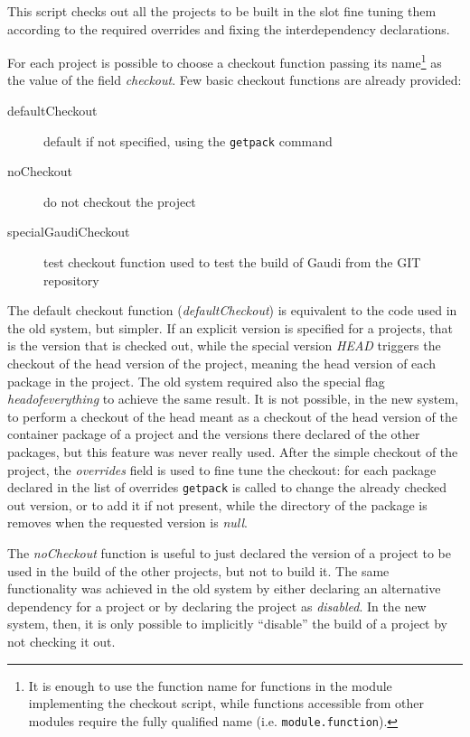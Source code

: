 \documentclass{lhcbnote}
\begin{document}
This script checks out all the projects to be built in the slot fine tuning them
according to the required overrides and fixing the interdependency declarations.

For each project is possible to choose a checkout function passing its
name\footnote{It is enough to use the function name for functions in the module
implementing the checkout script, while functions accessible from other modules
require the fully qualified name (i.e. \texttt{module.function}).} as the value
of the field \emph{checkout}.  Few basic checkout functions are already
provided:
\begin{description}
  \item[defaultCheckout] default if not specified, using the \texttt{getpack}
  command
  \item[noCheckout] do not checkout the project
  \item[specialGaudiCheckout] test checkout function used to test the build of
  Gaudi from the GIT repository
\end{description}

The default checkout function (\emph{defaultCheckout}) is equivalent to the code
used in the old system, but simpler.  If an explicit version is specified for a
projects, that is the version that is checked out, while the special version
\emph{HEAD} triggers the checkout of the head version of the project, meaning
the head version of each package in the project.  The old system required also
the special flag \emph{headofeverything} to achieve the same result.  It is not
possible, in the new system, to perform a checkout of the head meant as a
checkout of the head version of the container package of a project and the
versions there declared of the other packages, but this feature was never really
used.  After the simple checkout of the project, the \emph{overrides} field is
used to fine tune the checkout: for each package declared in the list of
overrides \texttt{getpack} is called to change the already checked out version,
or to add it if not present, while the directory of the package is removes when
the requested version is \emph{null}.

The \emph{noCheckout} function is useful to just declared the version of a
project to be used in the build of the other projects, but not to build it.  The
same functionality was achieved in the old system by either declaring an
alternative dependency for a project or by declaring the project as
\emph{disabled}.  In the new system, then, it is only possible to implicitly
``disable'' the build of a project by not checking it out.
\end{document}
